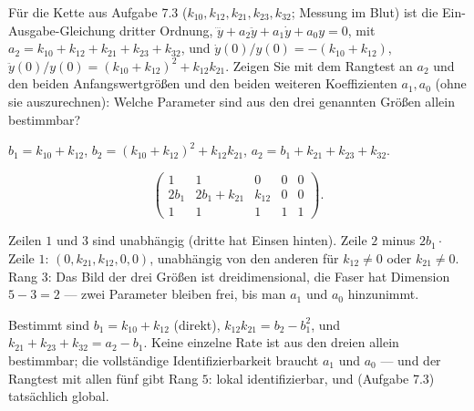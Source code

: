 \begin{aufgabe}
Für die Kette aus Aufgabe 7.3 ($k_{10}, k_{12}, k_{21}, k_{23}, k_{32}$; Messung im Blut) ist die Ein-Ausgabe-Gleichung dritter Ordnung, $\dddot y + a_2\ddot y + a_1\dot y + a_0y = 0$, mit
$a_2 = k_{10} + k_{12} + k_{21} + k_{23} + k_{32}$, und $\dot y(0)/y(0) = -(k_{10} + k_{12})$, $\ddot y(0)/y(0) = (k_{10} + k_{12})^{2} + k_{12}k_{21}$. Zeigen Sie mit dem Rangtest an $a_2$ und den beiden Anfangswertgrößen und den beiden weiteren Koeffizienten $a_1, a_0$ (ohne sie auszurechnen): Welche Parameter sind aus den drei genannten Größen allein bestimmbar?

\loesung
{}
$b_1 = k_{10} + k_{12}$, $b_2 = (k_{10} + k_{12})^{2} + k_{12}k_{21}$, $a_2 = b_1 + k_{21} + k_{23} + k_{32}$.

\[ \begin{pmatrix} 1 & 1 & 0 & 0 & 0\\ 2b_1 & 2b_1 + k_{21} & k_{12} & 0 & 0\\ 1 & 1 & 1 & 1 & 1 \end{pmatrix} . \]

Zeilen $1$ und $3$ sind unabhängig (dritte hat Einsen hinten). Zeile $2$ minus $2b_1\cdot$Zeile $1$: $(0, k_{21}, k_{12}, 0, 0)$, unabhängig von den anderen für $k_{12}\ne0$ oder $k_{21}\ne0$. Rang $3$: Das Bild der drei Größen ist dreidimensional, die Faser hat Dimension $5 - 3 = 2$ --- zwei Parameter bleiben frei, bis man $a_1$ und $a_0$ hinzunimmt.

Bestimmt sind $b_1 = k_{10} + k_{12}$ (direkt), $k_{12}k_{21} = b_2 - b_1^{2}$, und $k_{21} + k_{23} + k_{32} = a_2 - b_1$. Keine einzelne Rate ist aus den dreien allein bestimmbar; die vollständige Identifizierbarkeit braucht $a_1$ und $a_0$ --- und der Rangtest mit allen fünf gibt Rang $5$: lokal identifizierbar, und (Aufgabe 7.3) tatsächlich global.

\begin{center}
\begin{minipage}{0.88\textwidth}
\end{minipage}
\end{center}
\end{aufgabe}

